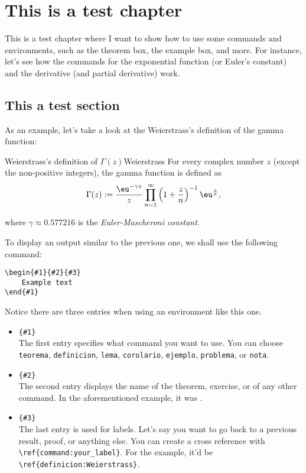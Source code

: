 \chapter{This is a test chapter}
This is a test chapter where I want to show how to use some commands and environments, such as the theorem box, the example box, and more. For instance, let's see how the commands for the exponential function (or Euler's constant) and the derivative (and partial derivative) work. 

\section{This a test section}
As an example, let's take a look at the Weierstrass's definition of the gamma function:

\begin{definicion}{Weierstrass's definition of $\Gamma(z)$}{Weierstrass}
For every complex number $z$ (except the non-positive integers), the gamma function is defined as
\[
\Gamma(z) := \dfrac{\eu^{-\gamma z}}{z} \prod_{n = 1}^{\infty}\left(1 + \dfrac{z}{n}\right)^{-1} \eu^{\frac{z}{n}},
\]

where $\gamma \approx 0.577216$ is the \textit{Euler-Mascheroni constant}.
\end{definicion}

To display an output similar to the previous one, we shall use the following command:

\begin{verbatim}
\begin{#1}{#2}{#3}
    Example text
\end{#1}
\end{verbatim}

Notice there are three entries when using an environment like this one.
\begin{itemize}
    \item \verb|{#1}|\\ 
    The first entry specifies what command you want to use. You can choose \texttt{teorema}, \texttt{definicion}, \texttt{lema}, \texttt{corolario}, \texttt{ejemplo}, \texttt{problema}, or \texttt{nota}.

    \item \verb|{#2}|\\
    The second entry displays the name of the theorem, exercise, or of any other command. In the aforementioned example, it was .

    \item \verb|{#3}|\\
    The last entry is used for labels. Let's say you want to go back to a previous result, proof, or anything else. You can create a cross reference with \verb|\ref{command:your_label}|. For the example, it'd be \verb|\ref{definicion:Weierstrass}|.
\end{itemize}

